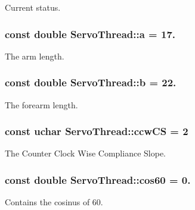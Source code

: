 Current status. 

\hypertarget{a00009_a7dc3998d380d61406fe4485f9872edff}{}
\subsubsection[{a}]{\setlength{\rightskip}{0pt plus 5cm}const double Servo\+Thread\+::a = 17.\hspace{0.3cm}{\ttfamily [private]}}\label{a00009_a7dc3998d380d61406fe4485f9872edff}


The arm length. 

\hypertarget{a00009_a14f03febaa39a60b9bf7ff9b9151060c}{}
\subsubsection[{b}]{\setlength{\rightskip}{0pt plus 5cm}const double Servo\+Thread\+::b = 22.\hspace{0.3cm}{\ttfamily [private]}}\label{a00009_a14f03febaa39a60b9bf7ff9b9151060c}


The forearm length. 

\hypertarget{a00009_ac2d1087cd0cc45ef71c77aa20b41ceda}{}
\subsubsection[{ccw\+C\+S}]{\setlength{\rightskip}{0pt plus 5cm}const uchar Servo\+Thread\+::ccw\+C\+S = 2\hspace{0.3cm}{\ttfamily [private]}}\label{a00009_ac2d1087cd0cc45ef71c77aa20b41ceda}


The Counter Clock Wise Compliance Slope. 

\hypertarget{a00009_a86dc58ff23326f939cd6fb610ac90d53}{}
\subsubsection[{cos60}]{\setlength{\rightskip}{0pt plus 5cm}const double Servo\+Thread\+::cos60 = 0.\hspace{0.3cm}{\ttfamily [private]}}\label{a00009_a86dc58ff23326f939cd6fb610ac90d53}


Contains the cosinus of 60. 

